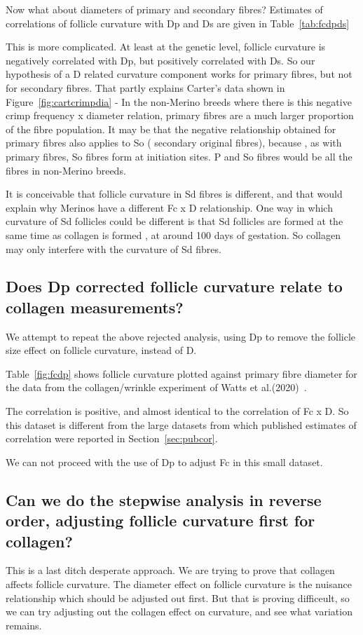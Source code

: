 \documentclass{article}
\begin{document}
Now what about diameters of primary and secondary fibres? Estimates of correlations of follicle curvature with Dp and Ds are given in Table~\ref{tab:fcdpds}

This is more complicated. At least at the genetic level, follicle curvature is negatively correlated with Dp, but positively correlated with Ds. So our hypothesis of a D related curvature component works for primary fibres, but not for secondary fibres. That partly explains Carter's data shown in Figure~\ref{fig:cartcrimpdia} - In the non-Merino breeds where there is this negative crimp frequency x diameter relation, primary fibres are a much larger proportion of the fibre population. It may be that the negative relationship obtained for primary fibres also applies to So ( secondary original fibres), because , as with primary fibres, So fibres form at initiation sites. P and So fibres would be all the fibres in non-Merino breeds. 

It is conceivable that follicle curvature in Sd fibres is different, and that would explain why Merinos have a different Fc x D relationship. One way in which curvature of Sd follicles could be different is that Sd follicles are formed at the same time as collagen is formed , at around 100 days of gestation. So collagen may only interfere with the curvature of Sd fibres.  

\subsection{Does Dp corrected follicle curvature relate to collagen measurements?}
We attempt to repeat the above rejected analysis, using Dp to remove the follicle size effect on follicle curvature, instead of D.

Table~\ref{fig:fcdp} shows follicle curvature plotted against primary fibre diameter for the data from the collagen/wrinkle experiment of Watts et al.(2020)~\cite{watts-2020}.

The correlation is positive, and almost identical to the correlation of Fc x D. So this dataset is different from the large datasets from which published estimates of correlation were reported in Section~\ref{sec:pubcor}.

We can not proceed with the use of Dp to adjust Fc in this small dataset. 

\subsection{Can we do the stepwise analysis in reverse order, adjusting follicle curvature first for collagen?}
This is a last ditch desperate approach. We are trying to prove that collagen affects follicle curvature. The diameter effect on follicle curvature is the nuisance relationship which should be adjusted out first. But that is proving difficeult,  so we can try adjusting out the collagen effect on curvature, and see what variation remains.
\end{document}
